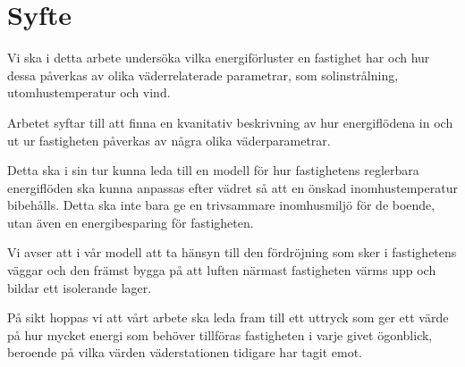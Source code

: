 \section{Syfte}
Vi ska i detta arbete undersöka vilka energiförluster en fastighet har och hur dessa påverkas av olika väderrelaterade parametrar, som solinstrålning, utomhustemperatur och vind.

Arbetet syftar till att finna en kvanitativ beskrivning av hur energiflödena in och ut ur fastigheten påverkas av några olika väderparametrar. 

Detta ska i sin tur kunna leda till en modell för hur fastighetens reglerbara energiflöden ska kunna anpassas efter vädret så att en önskad inomhustemperatur bibehålls. Detta ska inte bara ge en trivsammare inomhusmiljö för de boende, utan även en energibesparing för fastigheten.

Vi avser att i vår modell att ta hänsyn till den fördröjning som sker i fastighetens väggar och den främst bygga på att luften närmast fastigheten värms upp och bildar ett isolerande lager.

På sikt hoppas vi att vårt arbete ska leda fram till ett uttryck som ger ett värde på hur mycket energi som behöver tillföras fastigheten i varje givet ögonblick, beroende på vilka värden väderstationen tidigare har tagit emot.

